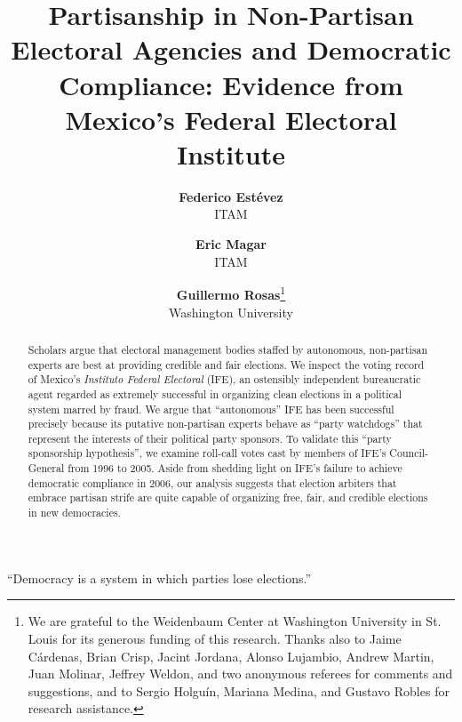 \documentclass[12 pt, letter]{article}
\begin{document}
\title{Partisanship in Non-Partisan Electoral Agencies and Democratic Compliance: Evidence from Mexico's Federal Electoral Institute}
\author{
\textbf{Federico Est\'evez}\\ITAM
\and 
\textbf{Eric Magar}\\ITAM
\and 
\textbf{Guillermo Rosas}\thanks{We are grateful to the Weidenbaum Center at Washington University in St. Louis for its generous funding of this research.  Thanks also to Jaime C\'ardenas, Brian Crisp, Jacint Jordana, Alonso Lujambio, Andrew Martin, Juan Molinar, Jeffrey Weldon, and two anonymous referees for comments and suggestions, and to Sergio Holgu\'in, Mariana Medina, and Gustavo Robles for research assistance.}\\Washington University}


\date{}
\maketitle

\begin{abstract}
\noindent Scholars argue that electoral management bodies staffed by autonomous, non-partisan experts are best at providing credible and fair elections.  We inspect the voting record of Mexico's \emph{Instituto Federal Electoral} (IFE), an ostensibly independent bureaucratic agent regarded as extremely successful in organizing clean elections in a political system marred by fraud. We argue that ``autonomous'' IFE has been successful precisely because its putative non-partisan experts behave as ``party watchdogs'' that represent the interests of their political party sponsors.  To validate this ``party sponsorship hypothesis'', we examine roll-call votes cast by members of IFE's Council-General from 1996 to 2005. Aside from shedding light on IFE's failure to achieve democratic compliance in 2006, our analysis suggests that election arbiters that embrace partisan strife  are quite capable of organizing free, fair, and credible elections in new democracies. \end{abstract}

\bigskip

\begin{flushright}
``Democracy is a system in which parties lose
elections.'' \\ \citet[p. 10]{Przeworski1991} \doublespacing
\end{flushright}
\end{document}
